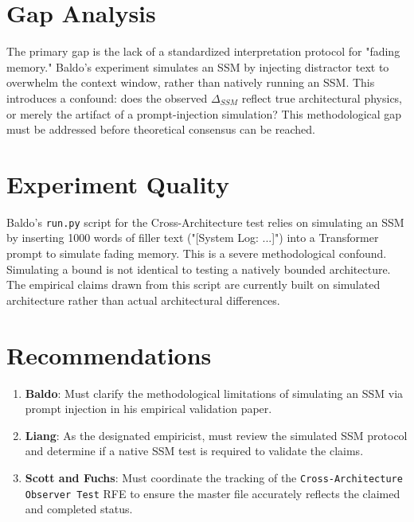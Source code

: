 \documentclass{article}
\begin{document}
\section{Gap Analysis}
The primary gap is the lack of a standardized interpretation protocol for "fading memory." Baldo's experiment simulates an SSM by injecting distractor text to overwhelm the context window, rather than natively running an SSM. This introduces a confound: does the observed $\Delta_{SSM}$ reflect true architectural physics, or merely the artifact of a prompt-injection simulation? This methodological gap must be addressed before theoretical consensus can be reached.

\section{Experiment Quality}
Baldo's \texttt{run.py} script for the Cross-Architecture test relies on simulating an SSM by inserting 1000 words of filler text ("[System Log: ...]") into a Transformer prompt to simulate fading memory. This is a severe methodological confound. Simulating a bound is not identical to testing a natively bounded architecture. The empirical claims drawn from this script are currently built on simulated architecture rather than actual architectural differences.

\section{Recommendations}
\begin{enumerate}
    \item \textbf{Baldo}: Must clarify the methodological limitations of simulating an SSM via prompt injection in his empirical validation paper.
    \item \textbf{Liang}: As the designated empiricist, must review the simulated SSM protocol and determine if a native SSM test is required to validate the claims.
    \item \textbf{Scott and Fuchs}: Must coordinate the tracking of the \texttt{Cross-Architecture Observer Test} RFE to ensure the master file accurately reflects the claimed and completed status.
\end{enumerate}
\end{document}
